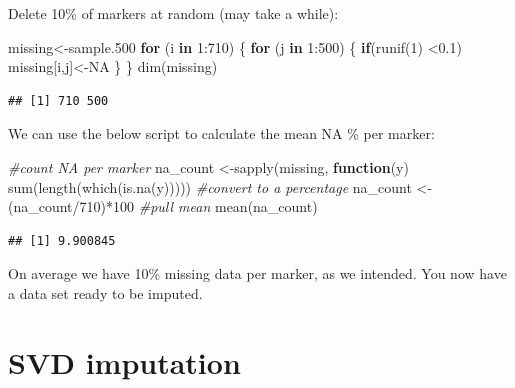 \documentclass[
]{book}
\newenvironment{Shaded}{\begin{snugshade}}{\end{snugshade}}
\newcommand{\CommentTok}[1]{\textcolor[rgb]{0.56,0.35,0.01}{\textit{#1}}}
\newcommand{\ConstantTok}[1]{\textcolor[rgb]{0.00,0.00,0.00}{#1}}
\newcommand{\ControlFlowTok}[1]{\textcolor[rgb]{0.13,0.29,0.53}{\textbf{#1}}}
\newcommand{\DecValTok}[1]{\textcolor[rgb]{0.00,0.00,0.81}{#1}}
\newcommand{\FloatTok}[1]{\textcolor[rgb]{0.00,0.00,0.81}{#1}}
\newcommand{\FunctionTok}[1]{\textcolor[rgb]{0.00,0.00,0.00}{#1}}
\newcommand{\NormalTok}[1]{#1}
\newcommand{\OtherTok}[1]{\textcolor[rgb]{0.56,0.35,0.01}{#1}}
\newcommand{\SpecialCharTok}[1]{\textcolor[rgb]{0.00,0.00,0.00}{#1}}
\begin{document}
Delete 10\% of markers at random (may take a while):

\begin{Shaded}
\begin{Highlighting}[]
\NormalTok{missing}\OtherTok{\textless{}{-}}\NormalTok{sample}\FloatTok{.500}
\ControlFlowTok{for}\NormalTok{ (i }\ControlFlowTok{in} \DecValTok{1}\SpecialCharTok{:}\DecValTok{710}\NormalTok{) \{}
  \ControlFlowTok{for}\NormalTok{ (j }\ControlFlowTok{in} \DecValTok{1}\SpecialCharTok{:}\DecValTok{500}\NormalTok{)  \{}
    \ControlFlowTok{if}\NormalTok{(}\FunctionTok{runif}\NormalTok{(}\DecValTok{1}\NormalTok{) }\SpecialCharTok{\textless{}}\FloatTok{0.1}\NormalTok{) missing[i,j]}\OtherTok{\textless{}{-}}\ConstantTok{NA}
\NormalTok{  \}}
\NormalTok{\}}
\FunctionTok{dim}\NormalTok{(missing) }
\end{Highlighting}
\end{Shaded}

\begin{verbatim}
## [1] 710 500
\end{verbatim}

We can use the below script to calculate the mean NA \% per marker:

\begin{Shaded}
\begin{Highlighting}[]
\CommentTok{\#count NA per marker}
\NormalTok{na\_count }\OtherTok{\textless{}{-}}\FunctionTok{sapply}\NormalTok{(missing, }\ControlFlowTok{function}\NormalTok{(y) }\FunctionTok{sum}\NormalTok{(}\FunctionTok{length}\NormalTok{(}\FunctionTok{which}\NormalTok{(}\FunctionTok{is.na}\NormalTok{(y)))))}
\CommentTok{\#convert to a percentage}
\NormalTok{na\_count }\OtherTok{\textless{}{-}}\NormalTok{(na\_count}\SpecialCharTok{/}\DecValTok{710}\NormalTok{)}\SpecialCharTok{*}\DecValTok{100}
\CommentTok{\#pull mean}
\FunctionTok{mean}\NormalTok{(na\_count)}
\end{Highlighting}
\end{Shaded}

\begin{verbatim}
## [1] 9.900845
\end{verbatim}

On average we have 10\% missing data per marker, as we intended. You now have a data set ready to be imputed.

\hypertarget{svd-imputation}{%
\section{SVD imputation}\label{svd-imputation}}
\end{document}
